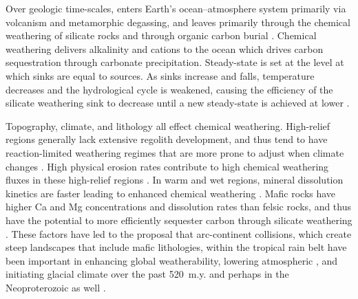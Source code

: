 Over geologic time-scales, \COtwo enters Earth's ocean--atmosphere system primarily via volcanism and metamorphic degassing, and leaves primarily through the chemical weathering of silicate rocks and through organic carbon burial \citep{Kump2000a}. Chemical weathering delivers alkalinity and cations to the ocean which drives carbon sequestration through carbonate precipitation. Steady-state \pCOtwo is set at the \pCOtwo level at which \COtwo sinks are equal to sources. As \COtwo sinks increase and \pCOtwo falls, temperature decreases and the hydrological cycle is weakened, causing the efficiency of the silicate weathering sink to decrease until a new steady-state is achieved at lower \pCOtwo \citep{Kump1997a}.

Topography, climate, and lithology all effect chemical weathering. High-relief regions generally lack extensive regolith development, and thus tend to have reaction-limited weathering regimes that are more prone to adjust when climate changes \citep{Gabet2009a, West2012a, Maher2014a}. High physical erosion rates contribute to high chemical weathering fluxes in these high-relief regions \citep{Godderis2017b}. In warm and wet regions, mineral dissolution kinetics are faster leading to enhanced chemical weathering \citep{Lasaga1994a, West2012a}. Mafic rocks have higher Ca and Mg concentrations and dissolution rates than felsic rocks, and thus have the potential to more efficiently sequester carbon through silicate weathering \citep{Dessert2003a}. These factors have led to the proposal that arc-continent collisions, which create steep landscapes that include mafic lithologies, within the tropical rain belt have been important in enhancing global weatherability, lowering atmospheric \pCOtwo, and initiating glacial climate over the past 520~m.y. \citep{Jagoutz2016a, Swanson-Hysell2017a, Macdonald2019a} and perhaps in the Neoproterozoic as well \citep{Park2020a}.

